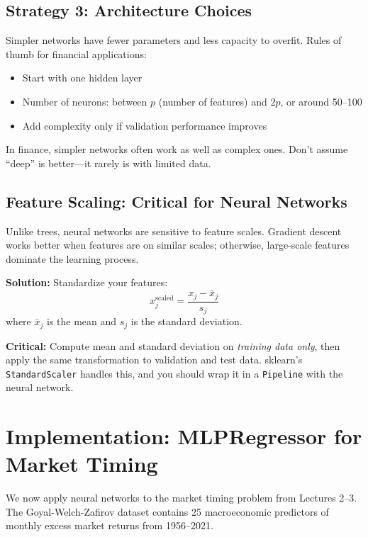 \documentclass[11pt,a4paper]{article}
\begin{document}
\subsection{Strategy 3: Architecture Choices}

Simpler networks have fewer parameters and less capacity to overfit. Rules of thumb for financial applications:
\begin{itemize}
    \item Start with one hidden layer
    \item Number of neurons: between $p$ (number of features) and $2p$, or around 50--100
    \item Add complexity only if validation performance improves
\end{itemize}

In finance, simpler networks often work as well as complex ones. Don't assume ``deep'' is better---it rarely is with limited data.

\subsection{Feature Scaling: Critical for Neural Networks}

Unlike trees, neural networks are sensitive to feature scales. Gradient descent works better when features are on similar scales; otherwise, large-scale features dominate the learning process.

\textbf{Solution:} Standardize your features:
\[
x_j^{\text{scaled}} = \frac{x_j - \bar{x}_j}{s_j}
\]
where $\bar{x}_j$ is the mean and $s_j$ is the standard deviation.

\textbf{Critical:} Compute mean and standard deviation on \textit{training data only}, then apply the same transformation to validation and test data. sklearn's \texttt{StandardScaler} handles this, and you should wrap it in a \texttt{Pipeline} with the neural network.

\section{Implementation: MLPRegressor for Market Timing}

We now apply neural networks to the market timing problem from Lectures 2--3. The Goyal-Welch-Zafirov dataset contains 25 macroeconomic predictors of monthly excess market returns from 1956--2021.
\end{document}
